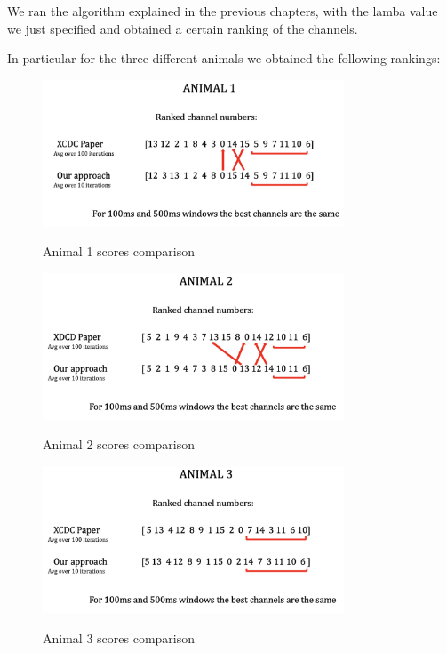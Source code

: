 \documentclass{Configuration_Files/PoliMi3i_thesis}
\begin{document}
We ran the algorithm explained in the previous chapters, with the lamba value we just specified and obtained a certain ranking of the channels.

In particular for the three different animals we obtained the following rankings:

\begin{figure}[H]
    \centering
    \includegraphics[width=0.8\textwidth]{Results Matteo/Screenshot 2024-08-18 at 18.54.22.png}
    \label{figure_ex1}
    \caption{Animal 1 scores comparison}
\end{figure}

\begin{figure}[H]
    \centering
    \includegraphics[width=0.8\textwidth]{Results Matteo/Screenshot 2024-08-18 at 18.54.28.png}
    \label{figure_ex2}
    \caption{Animal 2 scores comparison}
\end{figure}

\begin{figure}[H]
    \centering
    \includegraphics[width=0.8\textwidth]{Results Matteo/Screenshot 2024-08-18 at 18.54.30.png}
    \label{figure_ex3}
    \caption{Animal 3 scores comparison}
\end{figure}
\end{document}

